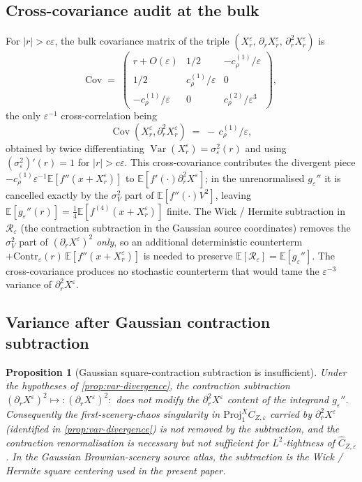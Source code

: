 \documentclass[11pt,reqno]{amsart}
\theoremstyle{plain}
\newtheorem{proposition}[theorem]{Proposition}
\theoremstyle{definition}
\theoremstyle{remark}
\newcommand{\E}{\mathbb{E}}
\newcommand{\IBM}{Z}
\DeclareMathOperator{\Var}{Var}
\DeclareMathOperator{\Cov}{Cov}
\begin{document}
\subsection*{Cross-covariance audit at the bulk}

For $|r|>c\varepsilon$, the bulk covariance matrix of the triple
$(X^\varepsilon_r,\,\partial_rX^\varepsilon_r,\,\partial_r^{2}X^\varepsilon_r)$
is
\[
  \mathrm{Cov}\;=\;
  \begin{pmatrix}
   r+O(\varepsilon) & 1/2 & -c_\rho^{(1)}/\varepsilon\\[2pt]
   1/2 & c_\rho^{(1)}/\varepsilon & 0\\[2pt]
   -c_\rho^{(1)}/\varepsilon & 0 & c_\rho^{(2)}/\varepsilon^{3}
  \end{pmatrix},
\]
the only $\varepsilon^{-1}$ cross-correlation being
\[
  \Cov(X^\varepsilon_r,\partial_r^{2}X^\varepsilon_r)
   \;=\;-\,c_\rho^{(1)}/\varepsilon,
\]
obtained by twice differentiating
$\Var(X^\varepsilon_r)=\sigma_\varepsilon^{2}(r)$ and using
$(\sigma_\varepsilon^{2})'(r)=1$ for $|r|>c\varepsilon$.
This cross-covariance contributes the divergent piece
$-c_\rho^{(1)}\varepsilon^{-1}\E[f''(x+X^\varepsilon_r)]$ to
$\E[f'(\cdot)\partial_r^{2}X^\varepsilon]$; in the unrenormalised
$g_\varepsilon''$ it is cancelled exactly by the $\sigma_V^{2}$ part
of $\E[f''(\cdot)V^{2}]$, leaving
$\E[g_\varepsilon''(r)]=\tfrac14\E[f^{(4)}(x+X^\varepsilon_r)]$
finite. The Wick / Hermite subtraction in $\mathcal R_\varepsilon$
(the contraction subtraction in the Gaussian source coordinates)
removes the $\sigma_V^{2}$ part of $(\partial_rX^\varepsilon)^{2}$
\emph{only}, so an additional deterministic counterterm
$+\mathrm{Contr}_\varepsilon(r)\,\E[f''(x+X^\varepsilon_r)]$ is
needed to preserve $\E[\mathcal R_\varepsilon]=\E[g_\varepsilon'']$.
The cross-covariance produces no stochastic counterterm that would
tame the $\varepsilon^{-3}$ variance of
$\partial_r^{2}X^\varepsilon$.

\subsection*{Variance after Gaussian contraction subtraction}

\begin{proposition}[Gaussian square-contraction subtraction is insufficient]
\label{prop:wick-insufficient}
Under the hypotheses of \cref{prop:var-divergence}, the contraction
subtraction
$(\partial_rX^\varepsilon)^{2}\mapsto:(\partial_rX^\varepsilon)^{2}:$
does not modify the $\partial_r^{2}X^\varepsilon$ content of the
integrand $g_\varepsilon''$. Consequently the
first-scenery-chaos singularity in
$\mathrm{Proj}_1^{X}C_{\IBM,\varepsilon}$ carried by
$\partial_r^{2}X^\varepsilon$ (identified in
\cref{prop:var-divergence}) is not removed by the subtraction, and
the contraction renormalisation is necessary but not sufficient for
$L^{2}$-tightness of $\widehat C_{\IBM,\varepsilon}$. In the Gaussian
Brownian-scenery source atlas, the subtraction is the Wick / Hermite
square centering used in the present paper.
\end{proposition}
\end{document}
